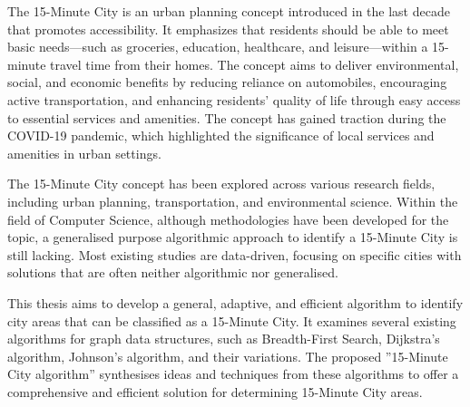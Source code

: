 \begin{Abstract}
\begin{changemargin}{1cm}{1cm}

The 15-Minute City is an urban planning concept introduced in the last decade that promotes accessibility. It emphasizes that residents should be able to meet basic needs—such as groceries, education, healthcare, and leisure—within a 15-minute travel time from their homes. The concept aims to deliver environmental, social, and economic benefits by reducing reliance on automobiles, encouraging active transportation, and enhancing residents’ quality of life through easy access to essential services and amenities. The concept has gained traction during the COVID-19 pandemic, which highlighted the significance of local services and amenities in urban settings.

\vspace{0.5cm}

The 15-Minute City concept has been explored across various research fields, including urban planning, transportation, and environmental science. Within the field of Computer Science, although methodologies have been developed for the topic, a generalised purpose algorithmic approach to identify a 15-Minute City is still lacking. Most existing studies are data-driven, focusing on specific cities with solutions that are often neither algorithmic nor generalised.

\vspace{0.5cm}

This thesis aims to develop a general, adaptive, and efficient algorithm to identify city areas that can be classified as a 15-Minute City. It examines several existing algorithms for graph data structures, such as Breadth-First Search, Dijkstra’s algorithm, Johnson’s algorithm, and their variations. The proposed ”15-Minute City algorithm” synthesises ideas and techniques from these algorithms to offer a comprehensive and efficient solution for determining 15-Minute City areas.

\end{changemargin}
\end{Abstract}